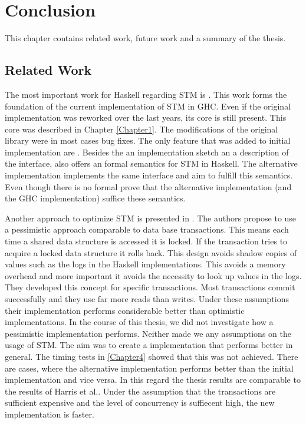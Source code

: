 \chapter{Conclusion}

\label{Chapter5}

This chapter contains related work, future work and a summary of the thesis.

\section{Related Work}
The most important work for Haskell regarding STM is \parencite{STMBase}. This work forms the foundation 
of the current implementation of STM in GHC. Even if the original implementation was reworked over the 
last years, its core is still present. This core was described in Chapter \ref{Chapter1}. The modifications
of the original library were in most cases bug fixes. The only feature that was added to initial
implementation are  \parencite{invariants}. Besides the an implementation sketch
an a description of the interface, \parencite{STMBase} also offers an formal semantics for STM in Haskell.
The alternative implementation implements the same interface and aim to fulfill this
semantics. Even though there is no formal prove that the alternative implementation (and the GHC implementation) 
suffice these semantics. 

Another approach to optimize STM is presented in \parencite{pessimisticSTM}. The authors propose to 
use a pessimistic approach comparable to data base transactions. This means each time a shared data structure 
is accessed it is locked. If the transaction tries to acquire a locked data structure it rolls back. 
This design avoids shadow copies of values such as the logs in the Haskell implementations. This avoids 
a memory overhead and more important it avoids the necessity to look up values in the logs. They developed 
this concept for specific transactions. Most transactions commit successfully and they use far more reads
than writes. Under these assumptions their implementation performs considerable better than optimistic 
implementations. In the course of this thesis, we did not investigate how a pessimistic implementation 
performs. Neither made we any assumptions on the usage of STM. The aim was to create a implementation
that performs better in general. The timing tests in \ref{Chapter4} showed that this was not achieved. 
There are cases, where the alternative implementation performs better than the initial implementation
and vice versa. In this regard the thesis results are comparable to the results of Harris et al.. 
Under the assumption that the transactions are sufficient expensive and the level of concurrency is 
suffiecent high, the new implementation is faster. 

